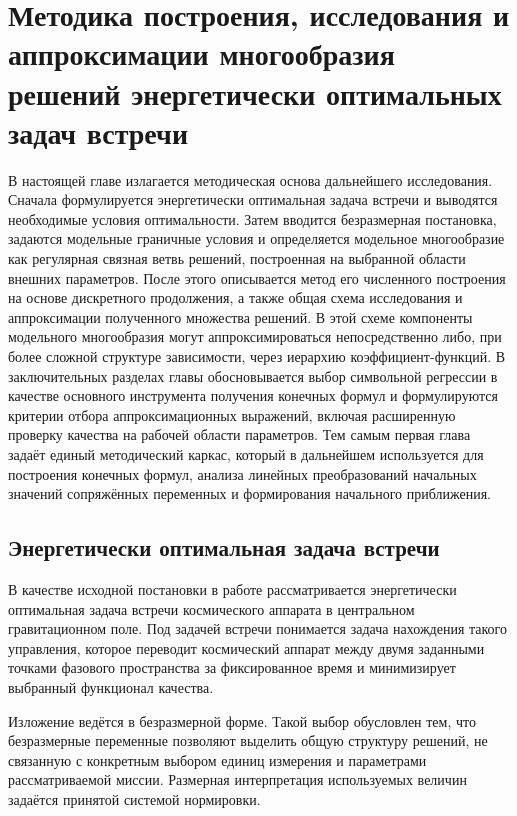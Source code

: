 \chapter{Методика построения, исследования и аппроксимации многообразия решений энергетически оптимальных задач встречи}

В настоящей главе излагается методическая основа дальнейшего исследования. Сначала формулируется энергетически оптимальная задача встречи и выводятся необходимые условия оптимальности. Затем вводится безразмерная постановка, задаются модельные граничные условия и определяется модельное многообразие как регулярная связная ветвь решений, построенная на выбранной области внешних параметров. После этого описывается метод его численного построения на основе дискретного продолжения, а также общая схема исследования и аппроксимации полученного множества решений. В этой схеме компоненты модельного многообразия могут аппроксимироваться непосредственно либо, при более сложной структуре зависимости, через иерархию коэффициент-функций. В заключительных разделах главы обосновывается выбор символьной регрессии в качестве основного инструмента получения конечных формул и формулируются критерии отбора аппроксимационных выражений, включая расширенную проверку качества на рабочей области параметров. Тем самым первая глава задаёт единый методический каркас, который в дальнейшем используется для построения конечных формул, анализа линейных преобразований начальных значений сопряжённых переменных и формирования начального приближения.

\section{Энергетически оптимальная задача встречи}

В качестве исходной постановки в работе рассматривается энергетически оптимальная задача встречи космического аппарата в центральном гравитационном поле. Под задачей встречи понимается задача нахождения такого управления, которое переводит космический аппарат между двумя заданными точками фазового пространства за фиксированное время и минимизирует выбранный функционал качества.

Изложение ведётся в безразмерной форме. Такой выбор обусловлен тем, что безразмерные переменные позволяют выделить общую структуру решений, не связанную с конкретным выбором единиц измерения и параметрами рассматриваемой миссии. Размерная интерпретация используемых величин задаётся принятой системой нормировки.

